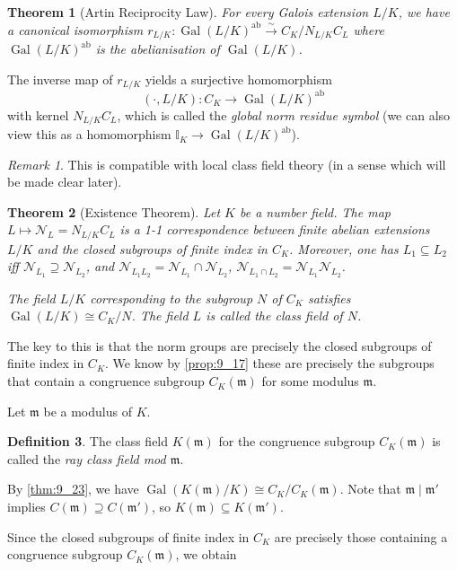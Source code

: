 \documentclass[11pt]{article}
\theoremstyle{definition}
\newtheorem{definition}{Definition}[section]
\theoremstyle{plain}
\newtheorem{theorem}[definition]{Theorem}
\theoremstyle{remark}
\newtheorem*{remark*}{Remark}
\DeclareMathOperator{\Gal}{Gal}
\newcommand{\II}{\mathbb{I}}
\newcommand{\cN}{\mathcal{N}}
\newcommand{\fm}{\mathfrak{m}}
\newcommand{\ab}{\mathrm{ab}}
\begin{document}
\begin{theorem}[Artin Reciprocity Law]\label{thm:9_22}
    For every Galois extension $L/K$, we have a canonical isomorphism $r_{L/K} : \Gal(L/K)^\ab \xrightarrow{\sim} C_K / N_{L/K}C_L$ where $\Gal(L/K)^\ab$ is the abelianisation of $\Gal(L/K)$.
\end{theorem}
    The inverse map of $r_{L/K}$ yields a surjective homomorphism
    \begin{equation*}
        (\cdot, L/K) : C_K \to \Gal(L/K)^\ab
    \end{equation*}
    with kernel $N_{L/K}C_L$, which is called the \emph{global norm residue symbol} (we can also view this as a homomorphism $\II_K \to \Gal(L/K)^\ab$).

\begin{remark*}
    This is compatible with local class field theory (in a sense which will be made clear later).
\end{remark*}

\begin{theorem}[Existence Theorem]\label{thm:9_23}
    Let $K$ be a number field. The map $L \mapsto \cN_L = N_{L/K} C_L$ is a 1-1 correspondence between finite abelian extensions $L/K$ and the closed subgroups of finite index in $C_K$. Moreover, one has $L_1 \subseteq L_2$ iff $\cN_{L_1} \supseteq \cN_{L_2}$, and $\cN_{L_1 L_2} = \cN_{L_1} \cap \cN_{L_2}$, $\cN_{L_1 \cap L_2} = \cN_{L_1} \cN_{L_2}$.

    The field $L/K$ corresponding to the subgroup $N$ of $C_K$ satisfies $\Gal(L/K) \cong C_K / N$. The field $L$ is called the \emph{class field} of $N$.
\end{theorem}

The key to this is that the norm groups are precisely the closed subgroups of finite index in $C_K$. We know by \autoref{prop:9_17} these are precisely the subgroups that contain a congruence subgroup $C_K(\fm)$ for some modulus $\fm$.

Let $\fm$ be a modulus of $K$.

\begin{definition}\label{def:9_24}
    The class field $K(\fm)$ for the congruence subgroup $C_K(\fm)$ is called the \emph{ray class field mod $\fm$}.
\end{definition}

By \autoref{thm:9_23}, we have $\Gal(K(\fm)/K) \cong C_K / C_K(\fm)$. Note that $\fm \mid \fm'$ implies $C(\fm) \supseteq C(\fm')$, so $K(\fm) \subseteq K(\fm')$.

Since the closed subgroups of finite index in $C_K$ are precisely those containing a congruence subgroup $C_K(\fm)$, we obtain
\end{document}
